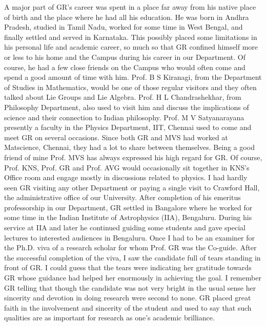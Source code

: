 A major part of GR's career was spent in a place far away from his native place of birth and the place where he had all his education. He was born in Andhra Pradesh, studied in Tamil Nadu, worked for some time in West Bengal, and finally settled and served in Karnataka. This possibly placed some limitations in his personal life and academic career, so much so that GR confined himself more or less to his home and the Campus during his career in our Department. Of course, he had a few close friends on the Campus who would often come and spend a good amount of time with him. Prof. B S Kiranagi, from the Department of Studies in Mathematics, would be one of those regular visitors and they often talked about Lie Groups and Lie Algebra. Prof. H L Chandrashekhar, from Philosophy Department, also used to visit him and discuss the implications of science and their connection to Indian philosophy. Prof. M V Satyanarayana presently a faculty in the Physics Department, IIT, Chennai used to come and meet GR on several occasions. Since both GR and MVS had worked at Matscience, Chennai, they had a lot to share between themselves. Being a good friend of mine Prof. MVS has always expressed his high regard for GR. Of course, Prof. KNS, Prof. GR and Prof. AVG would occasionally sit together in KNS's Office room and engage mostly in discussions related to physics. I had hardly seen GR visiting any other Department or paying a single visit to Crawford Hall, the administrative office of our University. After completion of his emeritus professorship in our Department, GR settled in Bangalore where he worked for some time in the Indian Institute of Astrophysics (IIA), Bengaluru. During his service at IIA and later he continued guiding some students and gave special lectures to interested audiences in Bengaluru. Once I had to be an examiner for the Ph.D. viva of a research scholar for whom Prof. GR was the Co-guide. After the successful completion of the viva, I saw the candidate full of tears standing in front of GR. I could guess that the tears were indicating her gratitude towards GR whose guidance had helped her enormously in achieving the goal. I remember GR telling that though the candidate was not very bright in the usual sense her sincerity and devotion in doing research were second to none. GR placed great faith in the involvement and sincerity of the student and used to say that such qualities are as important for research as one's academic brilliance.

